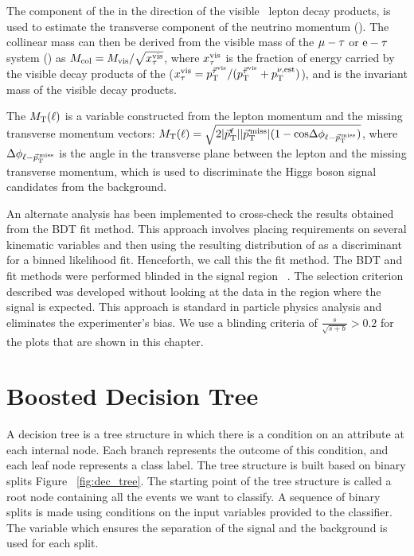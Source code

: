 The component of the \ptvecmiss in the direction of the visible \Pgt\, lepton decay products, is used to estimate the transverse component of the neutrino momentum (\ptnu). The collinear mass can then be derived from the visible mass of the $\mu-\tau$ or $\text{e}-\tau$ system (\mvis) as $M_{\text{col}} = M_{\text{vis}}/\sqrt{x_{\tau}^{\text{vis}}}$, where $x_{\tau}^{\text{vis}}$ is the fraction of energy carried by the visible decay products of the \Pgt ($x_{\tau}^{\text{vis}} = p_{\text{T}}^{\vec{\tau}^{\text{vis}}}/(p_{\text{T}}^{\vec{\tau}^{\text{vis}}} + p_{\text{T}}^{\nu,\text{est}})$), and \mvis is the invariant mass of the visible decay products.

The $M_\mathrm{T}(\ell)$ is a variable constructed from the lepton momentum and the missing transverse momentum vectors: $M_\mathrm{T}(\ell) = \sqrt{2\lvert\vec{p}_{\text{T}}^\ell\rvert\lvert{\vec p}_{\mathrm{T}}^{\kern1pt\text{miss}}\rvert (1-\text{cos}\Delta\phi_{\ell-{\vec p}_{\mathrm{T}}^{\kern1pt\text{miss}}})}$, where $\Delta\phi_{\ell-{\vec p}_{\mathrm{T}}^{\kern1pt\text{miss}}}$ is the angle in the transverse plane between the lepton and the missing transverse momentum, which is used to discriminate the Higgs boson signal candidates from the \wjets background.

An alternate analysis has been implemented to cross-check the results obtained from the BDT fit method. This approach involves placing requirements on several kinematic variables and then using the resulting distribution of \mcol as a discriminant for a binned likelihood fit. Henceforth, we call this the \mcol fit method. The BDT and \mcol fit methods were performed blinded in the signal region ~\cite{Roodman:2003rw}. The selection criterion described was developed without looking at the data in the region where the signal is expected. This approach is standard in particle physics analysis and eliminates the experimenter’s bias. We use a blinding criteria of $\frac{s}{\sqrt{s+b}} > 0.2$ for the plots that are shown in this chapter.

\section{Boosted Decision Tree}
\label{bdt}
A decision tree is a tree structure in which there is a condition on an attribute at each internal node. Each branch represents the outcome of this condition, and each leaf node represents a class label. The tree structure is built based on binary splits Figure ~\ref{fig:dec_tree}. The starting point of the tree structure is called a root node containing all the events we want to classify. A sequence of binary splits is made using conditions on the input variables provided to the classifier. The variable which ensures the separation of the signal and the background is used for each split.

